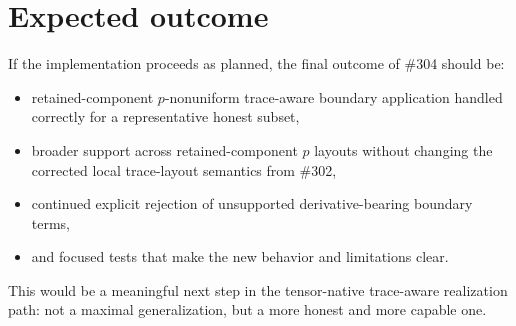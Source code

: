 \documentclass[11pt]{article}
\begin{document}
\section{Expected outcome}

If the implementation proceeds as planned, the final outcome of \#304 should be:
\begin{itemize}[leftmargin=*]
  \item retained-component \(p\)-nonuniform trace-aware boundary application handled correctly for a representative honest subset,
  \item broader support across retained-component \(p\) layouts without changing the corrected local trace-layout semantics from \#302,
  \item continued explicit rejection of unsupported derivative-bearing boundary terms,
  \item and focused tests that make the new behavior and limitations clear.
\end{itemize}

This would be a meaningful next step in the tensor-native trace-aware realization path: not a maximal generalization, but a more honest and more capable one.
\end{document}
